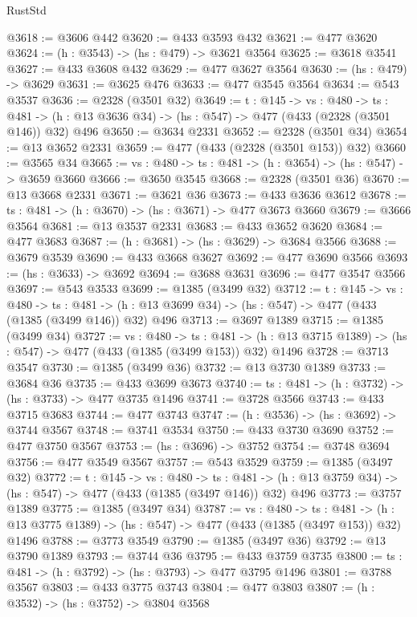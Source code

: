 \begin{lexlean}{RustStd}
\begin{coremodule}
@3618 := @3606 @442
@3620 := @433 @3593 @432
@3621 := @477 @3620
@3624 := (h : @3543) -> (hs : @479) -> @3621 @3564
@3625 := @3618 @3541
@3627 := @433 @3608 @432
@3629 := @477 @3627 @3564
@3630 := (hs : @479) -> @3629
@3631 := @3625 @476
@3633 := @477 @3545 @3564
@3634 := @543 @3537
@3636 := @2328 (@3501 @32)
@3649 := {t : @145} ->
  {vs : @480} ->
  {ts : @481} -> (h : @13 @3636 @34) -> (hs : @547) -> @477 (@433 (@2328 (@3501 @146)) @32) @496
@3650 := @3634 @2331
@3652 := @2328 (@3501 @34)
@3654 := @13 @3652 @2331
@3659 := @477 (@433 (@2328 (@3501 @153)) @32)
@3660 := @3565 @34
@3665 := {vs : @480} -> {ts : @481} -> (h : @3654) -> (hs : @547) -> @3659 @3660
@3666 := @3650 @3545
@3668 := @2328 (@3501 @36)
@3670 := @13 @3668 @2331
@3671 := @3621 @36
@3673 := @433 @3636 @3612
@3678 := {ts : @481} -> (h : @3670) -> (hs : @3671) -> @477 @3673 @3660
@3679 := @3666 @3564
@3681 := @13 @3537 @2331
@3683 := @433 @3652 @3620
@3684 := @477 @3683
@3687 := (h : @3681) -> (hs : @3629) -> @3684 @3566
@3688 := @3679 @3539
@3690 := @433 @3668 @3627
@3692 := @477 @3690 @3566
@3693 := (hs : @3633) -> @3692
@3694 := @3688 @3631
@3696 := @477 @3547 @3566
@3697 := @543 @3533
@3699 := @1385 (@3499 @32)
@3712 := {t : @145} ->
  {vs : @480} ->
  {ts : @481} -> (h : @13 @3699 @34) -> (hs : @547) -> @477 (@433 (@1385 (@3499 @146)) @32) @496
@3713 := @3697 @1389
@3715 := @1385 (@3499 @34)
@3727 := {vs : @480} ->
  {ts : @481} -> (h : @13 @3715 @1389) -> (hs : @547) -> @477 (@433 (@1385 (@3499 @153)) @32) @1496
@3728 := @3713 @3547
@3730 := @1385 (@3499 @36)
@3732 := @13 @3730 @1389
@3733 := @3684 @36
@3735 := @433 @3699 @3673
@3740 := {ts : @481} -> (h : @3732) -> (hs : @3733) -> @477 @3735 @1496
@3741 := @3728 @3566
@3743 := @433 @3715 @3683
@3744 := @477 @3743
@3747 := (h : @3536) -> (hs : @3692) -> @3744 @3567
@3748 := @3741 @3534
@3750 := @433 @3730 @3690
@3752 := @477 @3750 @3567
@3753 := (hs : @3696) -> @3752
@3754 := @3748 @3694
@3756 := @477 @3549 @3567
@3757 := @543 @3529
@3759 := @1385 (@3497 @32)
@3772 := {t : @145} ->
  {vs : @480} ->
  {ts : @481} -> (h : @13 @3759 @34) -> (hs : @547) -> @477 (@433 (@1385 (@3497 @146)) @32) @496
@3773 := @3757 @1389
@3775 := @1385 (@3497 @34)
@3787 := {vs : @480} ->
  {ts : @481} -> (h : @13 @3775 @1389) -> (hs : @547) -> @477 (@433 (@1385 (@3497 @153)) @32) @1496
@3788 := @3773 @3549
@3790 := @1385 (@3497 @36)
@3792 := @13 @3790 @1389
@3793 := @3744 @36
@3795 := @433 @3759 @3735
@3800 := {ts : @481} -> (h : @3792) -> (hs : @3793) -> @477 @3795 @1496
@3801 := @3788 @3567
@3803 := @433 @3775 @3743
@3804 := @477 @3803
@3807 := (h : @3532) -> (hs : @3752) -> @3804 @3568

\end{coremodule}
\end{lexlean}
